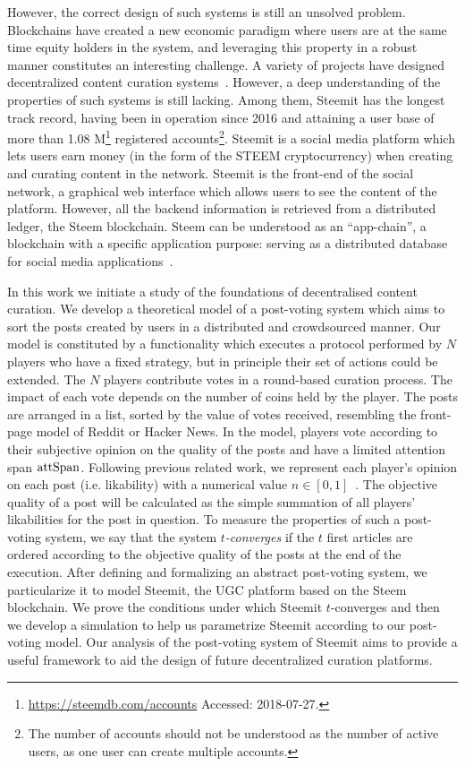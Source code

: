    However, the correct design of such systems is still an unsolved problem. Blockchains have created a new economic paradigm where users are at the same time equity holders in the system, and leveraging this property in a robust manner constitutes an interesting challenge.
   A variety of projects have designed decentralized content curation systems~\cite{synereo,steemit,tcr}. However, a deep understanding of the properties of such systems is still lacking. Among them, Steemit
has the longest track record, having been in operation since 2016 and attaining a user base of more than 1.08 M\footnote{\url{https://steemdb.com/accounts} Accessed: 2018-07-27.} registered accounts\footnote{The number of accounts should not be understood as the number of active users, as one user can create multiple accounts.}. Steemit is a social media platform which lets users earn money (in the form of the STEEM cryptocurrency) when creating and curating content in the network. Steemit is the front-end of the social network, a graphical web interface which allows users to see the content of the platform. However, all the backend information is retrieved from a distributed ledger, the Steem blockchain. Steem can be understood as an ``app-chain'', a blockchain with a specific application purpose: serving as a distributed database for social media applications~\cite{steemit}.

In this work we initiate a study of the foundations of decentralised content curation. We develop a theoretical model of a post-voting system which aims to sort the posts created by users in a distributed and crowdsourced manner.
  Our model is constituted by a functionality which executes a protocol performed by $N$ players who have a fixed strategy, but in principle their set of actions could be extended.
   The $N$ players contribute votes in a round-based curation process. The impact of each vote depends on the number of coins held by the player.
   The posts are arranged in a list, sorted by the value of votes received, resembling the front-page model of Reddit or Hacker News. In the model, players vote according to their subjective opinion on the quality of the posts and have a limited attention span $\mathrm{attSpan}$.
   Following previous related work, we represent each player's opinion on each post (i.e. likability) with a numerical value $n \in [ 0,1 ]$~\cite{ghosh2011incentivizing,askalidis2013theoretical}.
   The objective quality of a post will be calculated as the simple summation of all players' likabilities for the post in question. To measure the properties of such a post-voting system, we say that the system \textit{$t$-converges} if the $t$ first articles are ordered according to the objective quality of the posts at the end of the execution.
  After defining and formalizing an abstract post-voting system, we particularize it to model Steemit, the UGC platform based on the Steem blockchain.
   We prove the conditions under which Steemit $t$-converges and then we develop a simulation to help us parametrize Steemit according to our post-voting model.
   Our analysis of the post-voting system of Steemit aims to provide a useful framework to aid the design of future decentralized curation platforms. 

